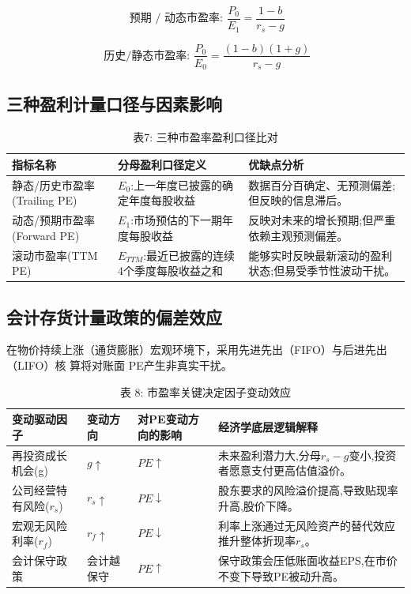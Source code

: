 \documentclass[lang=cn,10pt,color=blue]{elegantbook}
\begin{document}
$$
\text { 预期 / 动态市盈率: } \boxed {\frac {P _ {0}}{E _ {1}} = \frac {1 - b}{r _ {s} - g}}
$$

$$
\text { 历史/静态市盈率: } \boxed {\frac {P _ {0}}{E _ {0}} = \frac {(1 - b) (1 + g)}{r _ {s} - g}}
$$

\subsection{三种盈利计量口径与因素影响}

\begin{table}[ht]
  \centering
  \caption{表7: 三种市盈率盈利口径比对}
  \renewcommand{\arraystretch}{1.4}
\begin{tabularx}{\textwidth}{lYY}
  \toprule
  指标名称 & 分母盈利口径定义 & 优缺点分析 \\
  \midrule
  静态/历史市盈率(Trailing PE) & $E_0$:上一年度已披露的确定年度每股收益 & 数据百分百确定、无预测偏差;但反映的信息滞后。 \\
  动态/预期市盈率(Forward PE) & $E_1$:市场预估的下一期年度每股收益 & 反映对未来的增长预期;但严重依赖主观预测偏差。 \\
  滚动市盈率(TTM PE) & $E_{TTM}$:最近已披露的连续4个季度每股收益之和 & 能够实时反映最新滚动的盈利状态;但易受季节性波动干扰。 \\
  \bottomrule
\end{tabularx}
\end{table}

\subsection{会计存货计量政策的偏差效应}

在物价持续上涨（通货膨胀）宏观环境下，采用先进先出（FIFO）与后进先出（LIFO）核 算将对账面 PE产生非真实干扰。 

\begin{table}[ht]
  \centering
  \caption{表 8: 市盈率关键决定因子变动效应}
  \renewcommand{\arraystretch}{1.4}
\begin{tabularx}{\textwidth}{llYY}
  \toprule
  变动驱动因子 & 变动方向 & 对PE变动方向的影响 & 经济学底层逻辑解释 \\
  \midrule
  再投资成长机会(g) & $g \uparrow$ & $PE \uparrow$ & 未来盈利潜力大,分母$r_s - g$变小,投资者愿意支付更高估值溢价。 \\
  公司经营特有风险($r_s$) & $r_s \uparrow$ & $PE \downarrow$ & 股东要求的风险溢价提高,导致贴现率升高,股价下降。 \\
  宏观无风险利率($r_f$) & $r_f \uparrow$ & $PE \downarrow$ & 利率上涨通过无风险资产的替代效应推升整体折现率$r_s$。 \\
  会计保守政策 & 会计越保守 & $PE \uparrow$ & 保守政策会压低账面收益EPS,在市价不变下导致PE被动升高。 \\
  \bottomrule
\end{tabularx}
\end{table}
\end{document}
